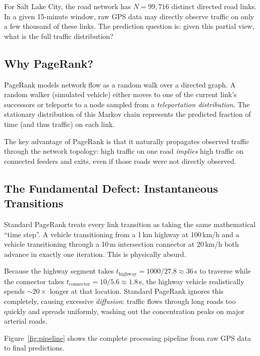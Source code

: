 \documentclass[12pt,a4paper]{article}
\theoremstyle{definition}
\theoremstyle{plain}
\begin{document}
For Salt Lake City, the road network has $N = 99{,}716$ distinct directed road links.
In a given 15-minute window, raw GPS data may directly observe traffic on only a few
thousand of these links. The prediction question is: given this partial view, what is the
full traffic distribution?

\subsection{Why PageRank?}

PageRank models network flow as a random walk over a directed graph. A random walker
(simulated vehicle) either moves to one of the current link's successors or teleports to
a node sampled from a \emph{teleportation distribution}. The stationary distribution of
this Markov chain represents the predicted fraction of time (and thus traffic) on each link.

The key advantage of PageRank is that it naturally propagates observed traffic through
the network topology: high traffic on one road \emph{implies} high traffic on connected
feeders and exits, even if those roads were not directly observed.

\subsection{The Fundamental Defect: Instantaneous Transitions}

\begin{warning}
  Standard PageRank treats every link transition as taking the same mathematical
  ``time step''. A vehicle transitioning from a 1\,km highway at 100\,km/h and a
  vehicle transitioning through a 10\,m intersection connector at 20\,km/h both
  advance in exactly one iteration. This is physically absurd.
\end{warning}

Because the highway segment takes $t_{\text{highway}} = 1000/27.8 \approx 36$\,s to
traverse while the connector takes $t_{\text{connector}} = 10/5.6 \approx 1.8$\,s, the
highway vehicle realistically spends $\sim\!20\times$ longer at that location.
Standard PageRank ignores this completely, causing excessive \emph{diffusion}: traffic
flows through long roads too quickly and spreads uniformly, washing out the concentration
peaks on major arterial roads.

Figure~\ref{fig:pipeline} shows the complete processing pipeline from raw GPS data to
final predictions.
\end{document}
